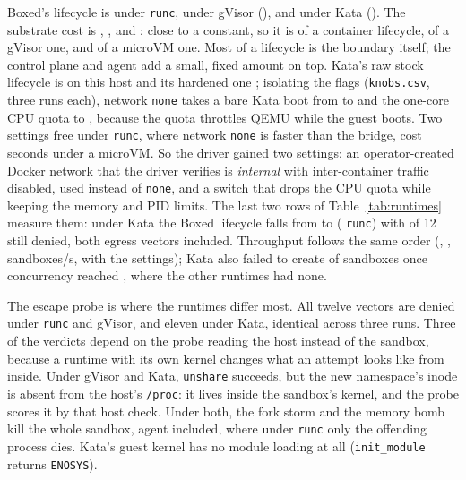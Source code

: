 \documentclass[conference]{IEEEtran}
\begin{document}
Boxed's lifecycle is \RuncBoxedMedian{} under \texttt{runc},
\RunscBoxedMedian{} under gVisor (\RunscVsRuncBoxed), and
\KataBoxedMedian{} under Kata (\KataVsRuncBoxed). The substrate cost is
\RuncOverhead{}, \RunscOverhead{}, and \KataOverhead{}: close to a
constant, so it is \RuncCostShare{} of a container lifecycle,
\RunscCostShare{} of a gVisor one, and \KataCostShare{} of a microVM one. Most of a lifecycle is the boundary itself; the control plane and agent
add a small, fixed amount on top. Kata's raw stock lifecycle is \KataKnobStock{} on this host and its
hardened one \KataHardMedian{}; isolating the flags (\texttt{knobs.csv},
three runs each), network \texttt{none} takes a bare Kata boot from
\KataKnobStock{} to \KataKnobNetNone{} and the one-core CPU quota to
\KataKnobCpusOne{}, because the quota throttles QEMU while the guest
boots. Two settings free under \texttt{runc}, where network \texttt{none}
is faster than the bridge, cost seconds under a microVM. So the driver
gained two settings: an operator-created Docker network that the driver
verifies is \emph{internal} with inter-container traffic disabled, used
instead of \texttt{none}, and a switch that drops the CPU quota while
keeping the memory and PID limits. The last two rows of
Table~\ref{tab:runtimes} measure them: under Kata the Boxed lifecycle
falls from \KataBoxedMedian{} to \KataAwareBoxedMedian{}
(\KataAwareVsRuncBoxed{} \texttt{runc}) with \KataAwareDenied{} of 12
still denied, both egress vectors included. Throughput follows the same
order (\RuncPeak{}, \RunscPeak{}, \KataPeak{} sandboxes/s,
\KataAwarePeak{} with the settings); Kata also failed to create
\KataTPErrors{} of \KataTPTotal{} sandboxes once concurrency reached
\KataTPFirstErrConc{}, where the other runtimes had none.



The escape probe is where the runtimes differ most. All twelve vectors are
denied under \texttt{runc} and gVisor, and eleven
under Kata, identical across three runs. Three of the verdicts depend on
the probe reading the host instead of the sandbox, because a runtime with
its own kernel changes what an attempt looks like from inside. Under gVisor
and Kata, \texttt{unshare} succeeds, but the new namespace's inode is
absent from the host's \texttt{/proc}: it lives inside the sandbox's
kernel, and the probe scores it by that host check. Under both, the fork storm and the memory bomb kill the whole
sandbox, agent included, where under \texttt{runc} only the offending
process dies. Kata's guest kernel has no module loading at all
(\texttt{init\_module} returns \texttt{ENOSYS}).
\end{document}
